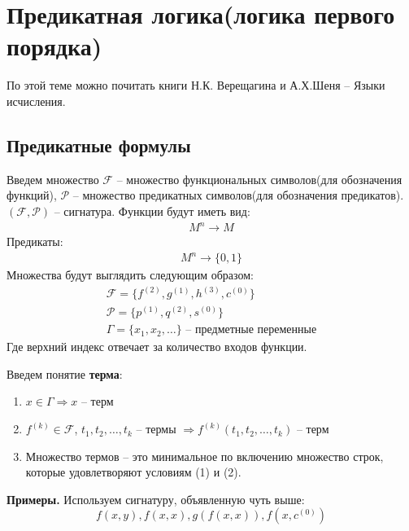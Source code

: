 \section{Предикатная логика(логика первого порядка)}
По этой теме можно почитать книги Н.К. Верещагина и А.Х.Шеня -- Языки исчисления. 
\subsection{Предикатные формулы}
\begin{conj}
    Введем множество $\mathcal{F}$ -- множество функциональных символов(для обозначения функций), $\mathcal{P}$ -- множество предикатных символов(для обозначения предикатов).
    $(\mathcal{F}, \mathcal{P})$ -- сигнатура. 
    Функции будут иметь вид:
    \begin{gather*}
        M^n \longrightarrow M
    \end{gather*} 
    Предикаты:
    \begin{gather*}
        M^n \longrightarrow \{0, 1\} 
    \end{gather*}
    Множества будут выглядить следующим образом:
    \begin{gather*}
        \mathcal{F} = \{f^{(2)}, g^{(1)}, h^{(3)}, c^{(0)}\} \\
        \mathcal{P} = \{p^{(1)}, q^{(2 )}, s^{(0)}\} \\
        \Gamma = \{x_1, x_2, \dots\} \text{ -- предметные переменные}
    \end{gather*}
    Где верхний индекс отвечает за количество входов функции. 
\end{conj}
\begin{conj}
    Введем понятие \textbf{терма}:
    \begin{enumerate}
        \item $x \in \Gamma \Longrightarrow x$ -- терм 
        \item $f^{(k)} \in \mathcal{F}$, $t_1, t_2, \dots, t_k$ -- термы $\Longrightarrow f^{(k)} (t_1, t_2, \dots, t_k)$ -- терм
        \item Множество термов -- это минимальное по включению множество строк, которые удовлетворяют условиям (1) и (2). 
    \end{enumerate}
\end{conj}

\textbf{Примеры.} Используем сигнатуру, объявленную чуть выше: \[ f(x, y), f(x, x), g(f(x, x)), f(x, c^{(0)}) \]

\vspace{3mm}

